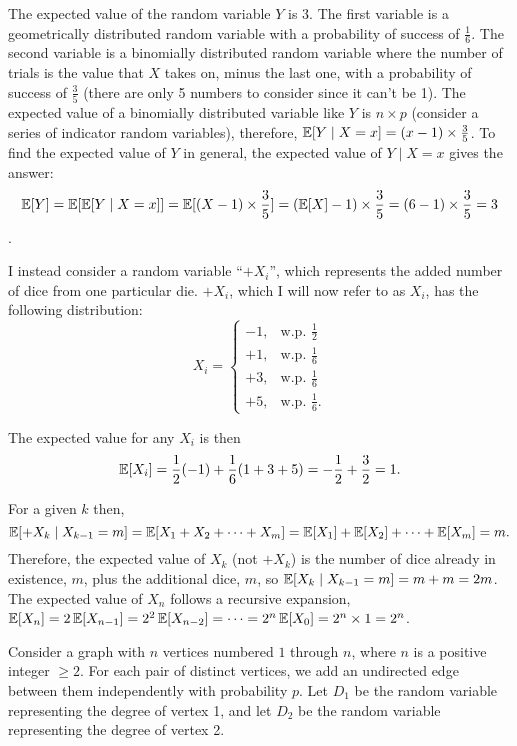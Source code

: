 \documentclass[11pt]{article}
\begin{document}
\begin{solution}
	
\begin{Parts}
	
\Part The expected value of the random variable $Y$ is 3. The first variable is
a geometrically distributed random variable with a probability of success of 
$\frac{1}{6}$. The second variable is a binomially distributed random variable
where the number of trials is the value that $X$ takes on, minus the last one, 
with a probability of success of $\frac{3}{5}$ (there are only 5 numbers to 
consider since it can't be 1). The expected value of a binomially distributed
variable like $Y$ is $n \times p$ (consider a series of indicator random 
variables), therefore, $\operatorname{\mathbb{E}}[Y \mid X = x] = (x-1) \times \frac{3}{5}$. To find
the expected value of $Y$ in general, the expected value of $Y \mid X = x$ gives
the answer: $$\operatorname{\mathbb{E}}[Y] = \operatorname{\mathbb{E}}[\operatorname{\mathbb{E}}[Y \mid X =x ]] = \operatorname{\mathbb{E}}[(X-1) \times \frac{3}{5}] = (\operatorname{\mathbb{E}}[X]
- 1) \times \frac{3}{5} = (6 -1 ) \times \frac{3}{5} = 3$$.

\Part I instead consider a random variable ``$+X_i$'', which represents the 
added number of dice from one particular die. $+X_i$, which I will now refer to
as $X_i$, has the following distribution: 
\[
X_i =
\begin{cases}
  -1, & \text{w.p. } \frac{1}{2} \\
  +1, & \text{w.p. } \frac{1}{6} \\
  +3, & \text{w.p. } \frac{1}{6} \\
  +5, & \text{w.p. } \frac{1}{6}.
\end{cases}
\]

The expected value for any $X_i$ is then $$\operatorname{\mathbb{E}}[X_i] = \frac{1}{2}(- 1) + 
\frac{1}{6}(1+3+5)= - \frac{1}{2} + \frac{3}{2} = 1.$$

For a given $k$ then, $$\operatorname{\mathbb{E}}[+X_k \mid X_{k-1} = m] = \operatorname{\mathbb{E}}[X_1 + X_2 + \dots + X_m] =
\operatorname{\mathbb{E}}[X_1] + \operatorname{\mathbb{E}}[X_2] + \dots + \operatorname{\mathbb{E}}[X_m] = m.$$ Therefore, the
expected value of $X_k$ (not $+X_k$) is the number of dice already in existence,
$m$, plus the additional dice, $m$, so $\operatorname{\mathbb{E}}[X_k \mid X_{k-1} = m] = m + m = 2m$. 
The expected value of $X_n$ follows a recursive expansion, $\operatorname{\mathbb{E}}[X_n] = 2 \operatorname{\mathbb{E}}[X_{n-1}]
=  2^2 \operatorname{\mathbb{E}}[X_{n-2}] = \dots = 2^n \operatorname{\mathbb{E}}[X_0] = 2^n \times 1 = 2^n$.

\end{Parts}

\end{solution}

Consider a graph with $n$ vertices numbered $1$ through $n$, where $n$ is a 
positive integer $\ge 2$. For each pair of distinct vertices, we add an 
undirected edge between them independently with probability $p$. Let $D_1$ be 
the random variable representing the degree of vertex 1, and let $D_2$ be the 
random variable representing the degree of vertex 2. 
\end{document}
